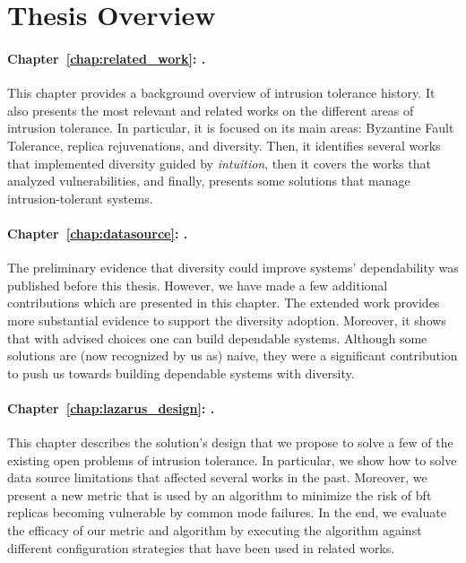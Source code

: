 \section{Thesis Overview}
\paragraph{Chapter~\ref{chap:related_work}: .}
This chapter provides a background overview of intrusion tolerance history. 
It also presents the most relevant and related works on the different areas of intrusion tolerance.
In particular, it is focused on its main areas: Byzantine Fault Tolerance, replica rejuvenations, and diversity.
Then, it identifies several works that implemented diversity guided by \emph{intuition}, then it covers the works that analyzed vulnerabilities, and finally, presents some solutions that manage intrusion-tolerant systems.


\paragraph{Chapter~\ref{chap:datasource}: .}
The preliminary evidence that diversity could improve systems' dependability was published before this thesis. 
However, we have made a few additional contributions which are presented in this chapter. 
The extended work provides more substantial evidence to support the diversity adoption.
Moreover, it shows that with advised choices one can build dependable systems.
Although some solutions are (now recognized by us as) naive, they were a significant contribution to push us towards building dependable systems with diversity.


\paragraph{Chapter~\ref{chap:lazarus_design}: .}
This chapter describes the solution's design that we propose to solve a few of the existing open problems of intrusion tolerance.
In particular, we show how to solve data source limitations that affected several works in the past.
Moreover, we present a new metric that is used by an algorithm to minimize the risk of \gls{bft} replicas becoming vulnerable by common mode failures.
In the end, we evaluate the efficacy of our metric and algorithm by executing the algorithm against different configuration strategies that have been used in related works.


